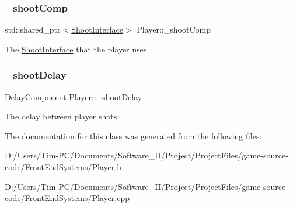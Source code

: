 \subsubsection{\texorpdfstring{\+\_\+shoot\+Comp}{\_shootComp}}
{\footnotesize\ttfamily std\+::shared\+\_\+ptr$<$\hyperlink{class_shoot_interface}{Shoot\+Interface}$>$ Player\+::\+\_\+shoot\+Comp\hspace{0.3cm}{\ttfamily [private]}}

The \hyperlink{class_shoot_interface}{Shoot\+Interface} that the player uses \mbox{\label{class_player_a6d672baf3630a81a32a8b9565129f559}} 
\subsubsection{\texorpdfstring{\+\_\+shoot\+Delay}{\_shootDelay}}
{\footnotesize\ttfamily \hyperlink{class_delay_component}{Delay\+Component} Player\+::\+\_\+shoot\+Delay\hspace{0.3cm}{\ttfamily [private]}}

The delay between player shots 

The documentation for this class was generated from the following files\+:\begin{DoxyCompactItemize}
\item 
D\+:/\+Users/\+Tim-\/\+P\+C/\+Documents/\+Software\+\_\+\+I\+I/\+Project/\+Project\+Files/game-\/source-\/code/\+Front\+End\+Systems/Player.\+h\item 
D\+:/\+Users/\+Tim-\/\+P\+C/\+Documents/\+Software\+\_\+\+I\+I/\+Project/\+Project\+Files/game-\/source-\/code/\+Front\+End\+Systems/Player.\+cpp\end{DoxyCompactItemize}
